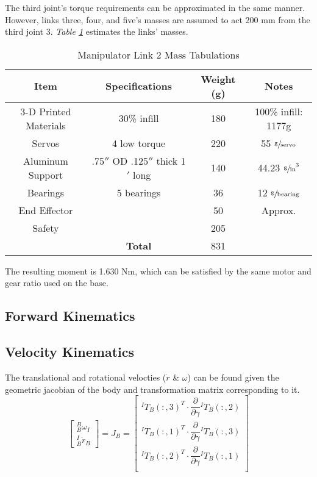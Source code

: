 The third joint’s torque requirements can be approximated in the same manner. However, links three, four, and five’s masses are assumed to act 200 mm from the third joint 3. \emph{Table \ref{tab:arm2}} estimates the links’ masses.

\begin{table}[htp]
  \center
  \caption{Manipulator Link 2 Mass Tabulations}
  \label{tab:arm2}
\begin{tabular}{cc|cc}
\textbf{Item} & \textbf{Specifications} & \textbf{Weight (g)} & \textbf{Notes} \\\hline
3-D Printed Materials & 30\% infill & 180 & 100\% infill: 1177g \\
Servos & 4 low torque & 220 & 55 $\sfrac{\text{g}}{\text{servo}}$ \\
Aluminum Support & .75$''$ OD .125$''$ thick 1$'$ long & 140 & 44.23 $\sfrac{\text{g}}{\text{in}}^3$ \\
Bearings & 5 bearings & 36 & 12 $\sfrac{\text{g}}{\text{bearing}}$ \\
End Effector & & 50 & Approx. \\
Safety & & 205 & \\
& \textbf{Total} & 831 & \\
\end{tabular}
\end{table}

The resulting moment is 1.630 Nm, which can be satisfied by the same motor and gear ratio used on the base.

\subsection{Forward Kinematics}

\subsection{Velocity Kinematics}
The translational and rotational velocties ($\dot{r}$ \& $\omega$) can be found given the geometric jacobian of the body and transformation matrix corresponding to it.
\[
\begin{bmatrix}
  ^B_B\omega_I\\
  ^I_B\dot{r}_B
\end{bmatrix}
= J_B =
\begin{bmatrix}
  ^IT_B(:,3)^T \cdot \dfrac{\partial}{\partial\gamma}{}^IT_B(:,2) \\
  ^IT_B(:,1)^T \cdot \dfrac{\partial}{\partial\gamma}{}^IT_B(:,3) \\
  ^IT_B(:,2)^T \cdot \dfrac{\partial}{\partial\gamma}{}^IT_B(:,1) \\
\end{bmatrix}
\]

